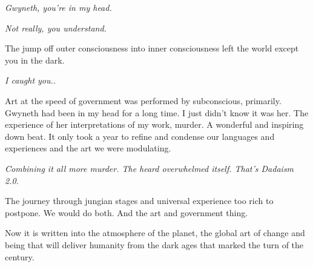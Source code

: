 

\indent

{\it Gwyneth, you're in my head.}

{\it Not really, you understand.}

\noindent
\break

The jump off outer consciousness into inner consciousness left the
world except you in the dark.

\indent

{\it I caught you..} 

\noindent
\break

Art at the speed of government was performed by subconscious,
primarily.  Gwyneth had been in my head for a long time.  I just
didn't know it was her.  The experience of her interpretations of my
work, murder.  A wonderful and inspiring down beat.  It only took a
year to refine and condense our languages and experiences and the art
we were modulating.

\indent

{\it Combining it all more murder.  The heard overwhelmed itself.
That's Dadaism 2.0.}

\noindent
\break

The journey through jungian stages and universal experience too rich
to postpone.  We would do both.  And the art and government thing.

Now it is written into the atmosphere of the planet, the global art of
change and being that will deliver humanity from the dark ages that
marked the turn of the century.

\bye
